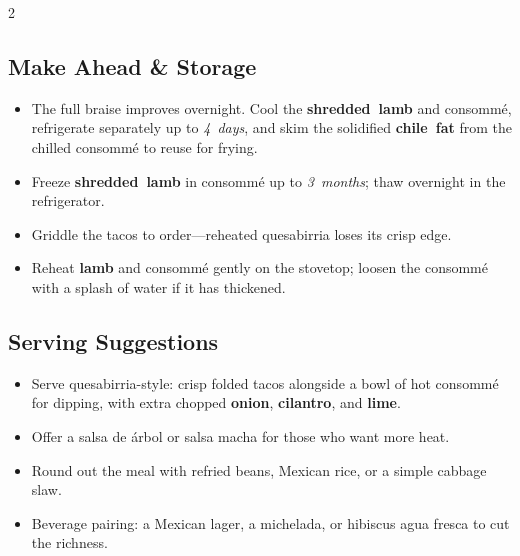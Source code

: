 \documentclass[11pt,letterpaper]{article}
\begin{document}
{\begin{multicols}{2}
\subsection*{Make Ahead \& Storage}
\begin{itemize}
    \item The full braise improves overnight. Cool the \textbf{shredded~lamb} and consommé, refrigerate separately up to \textit{4~days}, and skim the solidified \textbf{chile~fat} from the chilled consommé to reuse for frying.
    \item Freeze \textbf{shredded~lamb} in consommé up to \textit{3~months}; thaw overnight in the refrigerator.
    \item Griddle the tacos to order---reheated quesabirria loses its crisp edge.
    \item Reheat \textbf{lamb} and consommé gently on the stovetop; loosen the consommé with a splash of water if it has thickened.
\end{itemize}

\subsection*{Serving Suggestions}
\begin{itemize}
    \item Serve quesabirria-style: crisp folded tacos alongside a bowl of hot consommé for dipping, with extra chopped \textbf{onion}, \textbf{cilantro}, and \textbf{lime}.
    \item Offer a salsa de árbol or salsa macha for those who want more heat.
    \item Round out the meal with refried beans, Mexican rice, or a simple cabbage slaw.
    \item Beverage pairing: a Mexican lager, a michelada, or hibiscus agua fresca to cut the richness.
\end{itemize}


\end{multicols}
}
\end{document}
